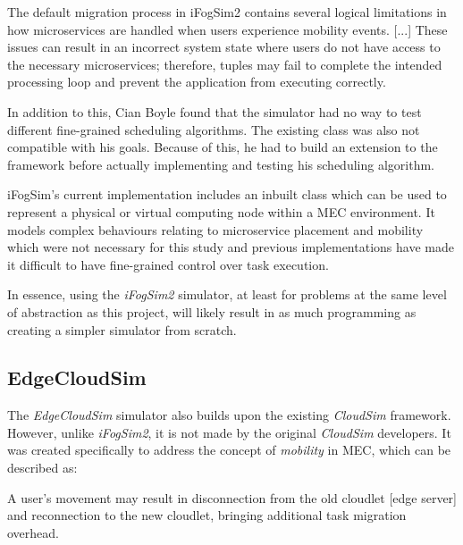 \documentclass[]{UCD_CS_Interim_Report}
\renewenvironment{leftbar}{%
    \def\FrameCommand{%
        {\color{gray}\vrule width 1pt}%
        \hspace{12pt}%
    }%
    \MakeFramed{%
        \advance\hsize-\width
        \FrameRestore
        \setlength{\parskip}{0pt}%
    }%
    \itshape
    \vspace{8pt}%
}{%
    \par\vspace{8pt}%
    \endMakeFramed
    \vspace{-\parskip}%
}
\begin{document}
\begin{leftbar}
    The default migration process in iFogSim2 contains several logical limitations in how microservices are handled when users experience mobility events. [...] These issues can result in an incorrect system state where users do not have access to the necessary microservices; therefore, tuples may fail to complete the intended processing loop and prevent the application from executing correctly. \cite{finn2026hepa}
\end{leftbar}

In addition to this, Cian Boyle found that the simulator had no way to test different fine-grained scheduling algorithms. The existing  class was also not compatible with his goals. Because of this, he had to build an extension to the framework before actually implementing and testing his scheduling algorithm.

\begin{leftbar}
    iFogSim’s current implementation includes an inbuilt \textnormal{} class which can be used to represent a physical or virtual computing node within a MEC environment. It models complex behaviours relating to microservice placement and mobility which were not necessary for this  study and previous implementations have made it difficult to have fine-grained control over task execution. \cite{boyle2026pats}
\end{leftbar}

In essence, using the \textit{iFogSim2} simulator, at least for problems at the same level of abstraction as this project, will likely result in as much programming as creating a simpler simulator from scratch.

\subsection{EdgeCloudSim}
The \textit{EdgeCloudSim} \cite{edgecloudsim2018} simulator also builds upon the existing \textit{CloudSim} framework. However, unlike \textit{iFogSim2}, it is not made by the original \textit{CloudSim} developers. It was created specifically to address the concept of \textit{mobility} in MEC, which can be described as:

\begin{leftbar}
    A user's movement may result in disconnection from the old cloudlet [edge server] and reconnection to the new cloudlet, bringing additional task migration overhead. \cite{zheng2024mobility}
\end{leftbar}
\end{document}
